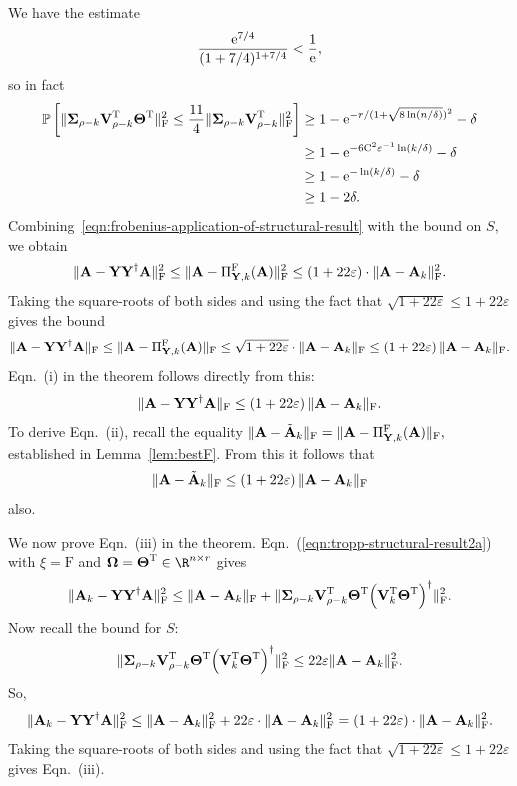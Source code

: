 We have the estimate
\[
\frac{\expe^{7/4}}{ (1 + 7/4)^{1 + 7/4} } < \frac{1}{\expe},
\]
so in fact
\begin{align*}
\Probab{\FNormS{\matSig_{\rho-k} \matV_{\rho-k}\transp   \matTh\transp} \le  \frac{11}{4} \FNormS{\matSig_{\rho-k} \matV_{\rho-k}\transp  }} & \geq 1 - \expe^{-r/(1 + \sqrt{8 \ln(n/\delta)})^2} - \delta \\
 & \ge 1 - \expe^{-6 \const{C}^2 \varepsilon^{-1} \ln(k/\delta)} - \delta \\\
 & \ge 1 - \expe^{ -\ln(k/\delta)} - \delta \\
  & \ge 1 - 2\delta.
\end{align*}
Combining~\eqref{eqn:frobenius-application-of-structural-result} with the bound on $S$, we obtain
\[
\FNormS{\matA - \matY \pinv{\matY} \matA }  \le \FNormS{\matA - \Pi_{\matY,k}^{\mathrm{F}}(\matA) } \le \left( 1 +  22 \varepsilon \right) \cdot \FNormS{\matA-\matA_k}.
\]
Taking the square-roots of both sides
and using the fact that $\sqrt{1 +  22 \varepsilon} \le 1 +  22 \varepsilon$ gives the bound
\[
\FNorm{\matA - \matY \pinv{\matY} \matA } \le \FNorm{\matA - \Pi_{\matY,k}^{\mathrm{F}}(\matA) }
 \le \sqrt{1 + 22 \varepsilon} \cdot \FNorm{\matA-\matA_k} \le \left( 1 +  22 \varepsilon \right)  \FNorm{\matA-\matA_k}.
\]
Eqn.~(i) in the theorem follows directly from this:
\[
 \FNorm{\matA - \matY \pinv{\matY} \matA } \le \left( 1 +  22 \varepsilon \right)  \FNorm{\matA-\matA_k}.
\]
To derive Eqn.~(ii), recall the equality $\FNorm{\matA - \tilde{\matA}_k } =\FNorm{\matA - \Pi_{\matY,k}^{\mathrm{F}}(\matA) }, $ established in Lemma~\ref{lem:bestF}. From this it follows that
\[
 \FNorm{\matA - \tilde{\matA}_k } \leq \left( 1 +  22 \varepsilon \right)  \FNorm{\matA-\matA_k}
\]
also.

We now prove Eqn.~(iii) in the theorem. Eqn.~(\ref{eqn:tropp-structural-result2a}) with $\xi = \mathrm{F}$ and $\matOmega = \matTh\transp \in \R^{n \times r}$  gives
$$
\FNormS{\matA_k - \matY \pinv{\matY} \matA} \leq \FNorm{\matA - \matA_k} +
\FNormS{\matSig_{\rho - k} \matV_{\rho-k} \transp \matTh\transp \pinv{\left( \matV_k \transp \matTh\transp \right)} }.
$$
Now recall the bound for $S$:
$$ \FNormS{\matSig_{\rho - k} \matV_{\rho-k} \transp \matTh\transp \pinv{\left( \matV_k \transp\matTh\transp \right)} } \le 22 \varepsilon \FNormS{\matA-\matA_k}.$$
So,
$$
\FNormS{\matA_k - \matY \pinv{\matY} \matA} \leq \FNormS{\matA - \matA_k} +
22 \varepsilon \cdot \FNormS{\matA - \matA_k}  = \left( 1 + 22 \varepsilon \right) \cdot \FNormS{\matA - \matA_k}.
$$
Taking the square-roots of both sides and using the fact that $\sqrt{1 +  22 \varepsilon} \le 1 +  22 \varepsilon$ gives Eqn.~(iii).

